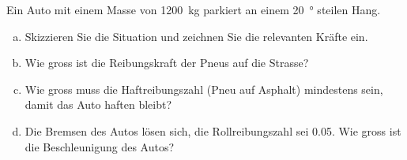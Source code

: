 \begin{aufgabe}
	Ein Auto mit einem Masse von \SI{1200}{kg} parkiert an einem \SI{20}{\degree} steilen Hang.
	\begin{enumerate} [a)]
		\item Skizzieren Sie die Situation und zeichnen Sie die relevanten Kräfte ein.
		\item Wie gross ist die Reibungskraft der Pneus auf die Strasse?
		\item Wie gross muss die Haftreibungszahl (Pneu auf Asphalt) mindestens sein, damit das Auto haften bleibt?
		\item Die Bremsen des Autos lösen sich, die Rollreibungszahl sei \num{0.05}. Wie gross ist die Beschleunigung des Autos?
	\end{enumerate}
\end{aufgabe}

